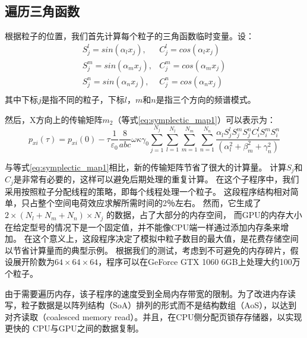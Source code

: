 \subsection{遍历三角函数}
根据粒子的位置，我们首先计算每个粒子的三角函数临时变量。设：
\begin{equation}
\begin{array}{cc}
    S^{l}_j =sin(\alpha_l x_j), & C^{l}_j =cos(\alpha_l x_j)  \\
    S^{m}_j =sin(\alpha_m x_j), & C^{m}_j =cos(\alpha_m x_j)  \\
    S^{n}_j =sin(\alpha_n x_j), & C^{n}_j =cos(\alpha_n x_j)  \\
\end{array}
\end{equation}
其中下标$j$是指不同的粒子，下标$l$，$m$和$n$是指三个方向的频谱模式。

然后，X方向上的传输矩阵$m_2$（等式\ref{eq:symplectic_map1}）可以表示为：
\begin{equation}\label{eq:symplectic_map2}
{{p}_{xi}}(\tau )={{p}_{xi}}(0)-\tau \frac{1}{{{\varepsilon }_{0}}}\frac{8}{abc}\omega \kappa {{\gamma }_{0}}\sum\limits_{j=1}^{{{N}_{j}}}{\sum\limits_{l=1}^{{{N}_{l}}}{\sum\limits_{m=1}^{{{N}_{m}}}{\sum\limits_{n=1}^{{{N}_{n}}}{\frac{{{\alpha }_{l}}S_{j}^{l}S_{j}^{m}S_{j}^{n}C_{i}^{l}S_{i}^{m}S_{i}^{n}}{(\alpha _{l}^{2}+\beta _{m}^{2}+\gamma _{n}^{2})}}}}}
\end{equation}

与等式\ref{eq:symplectic_map1}相比，新的传输矩阵节省了很大的计算量。
计算$S_ {j} $和$C_ {j}$是非常有必要的，这样可以避免后期处理的重复计算。
在这个子程序中，我们采用按照粒子分配线程的策略，即每个线程处理一个粒子。
这段程序结构相对简单，只占整个空间电荷效应求解所需时间的2％左右。
然而，它生成了$ 2 \times({{N}_{l}} + {{N}_{m}} + {{N}_{n}})\times {{N} _ {j}} $ 的数据，占了大部分的内存空间，
而GPU的内存大小在给定型号的情况下是一个固定值，并不能像CPU端一样通过添加内存条来增加。
在这个意义上，这段程序决定了模拟中粒子数目的最大值，是花费存储空间以节省计算量而的典型示例。
根据我们的测试，考虑到不可避免的内存碎片，假设展开阶数为$64\times64\times64$，程序可以在GeForce GTX 1060 6GB上处理大约100万个粒子。

由于需要遍历内存，该子程序的速度受到全局内存带宽的限制。为了改进内存读写，粒子数据是以阵列结构（SoA）排列的形式而不是结构数组（AoS），以达到对齐读取（coalesced memory read）。并且，在CPU侧分配页锁存存储器，以实现更快的 CPU与GPU之间的数据复制。

